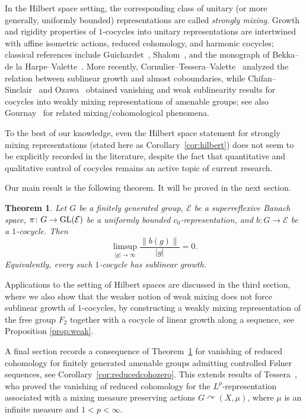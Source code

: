 \documentclass[a4paper,11pt]{amsproc}
\newtheorem{theorem}{Theorem}
\theoremstyle{remark}
\newcommand{\norm}[1]{\left\lVert #1\right\rVert}
\newcommand{\cE}{\mathcal E}
\begin{document}
In the Hilbert space setting, the corresponding class of unitary (or more generally, uniformly bounded) representations are called \emph{strongly mixing}. Growth and rigidity properties of $1$-cocycles into unitary representations are intertwined with affine isometric actions, reduced cohomology, and harmonic cocycles; classical references include Guichardet~\cite{Guichardet72}, Shalom~\cite{Shalom00}, and the monograph of Bekka--de la Harpe--Valette~\cite{BdlHV08}. More recently, Cornulier--Tessera--Valette~\cite{CTV07} analyzed the relation between sublinear growth and almost coboundaries, while Chifan--Sinclair~\cite{CS15} and Ozawa~\cite{Oz18} obtained vanishing and weak sublinearity results for cocycles into weakly mixing representations of amenable groups; see also Gournay~\cite{Gou18} for related mixing/cohomological phenomena.

To the best of our knowledge, even the Hilbert space statement for strongly mixing representations (stated here as Corollary~\ref{cor:hilbert}) does not seem to be explicitly recorded in the literature, despite the fact that quantitative and qualitative control of cocycles remains an active topic of current research. 

\medskip

Our main result is the following theorem. It will be proved in the next section.
\begin{theorem}\label{thm:main}
Let $G$ be a finitely generated group, $\cE$ be a superreflexive Banach space,
$
\pi\colon G\to {\rm GL}(\cE)
$
be a uniformly bounded $c_{0}$-representation, and  $b\colon G\to \cE$ be a $1$-cocycle. Then
\[
\limsup_{|g|\to\infty}\frac{\norm{b(g)}}{|g|}=0.
\]
Equivalently, every such $1$-cocycle has sublinear growth.
\end{theorem}

Applications to the setting of Hilbert spaces are discussed in the third section, where we also show that the weaker notion of weak mixing does not force sublinear growth of $1$-cocycles, by constructing a weakly mixing representation of the free group $F_2$ together with a cocycle of linear growth along a sequence, see Proposition \ref{prop:weak}. 

A final section records a consequence of Theorem~\ref{thm:main} for vanishing of reduced cohomology for finitely generated amenable groups admitting controlled Følner sequences, see Corollary~\ref{cor:reducedcohozero}. This extends results of Tessera~\cite{Tess09}, who proved the vanishing of reduced cohomology for the $L^p$-representation associated with a mixing measure preserving actions $G \curvearrowright (X,\mu)$, where $\mu$ is an infinite measure and $1< p < \infty$.
\end{document}
